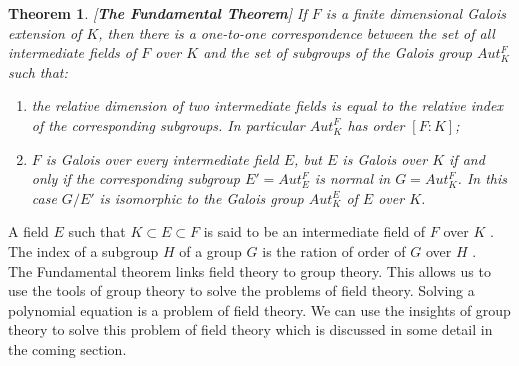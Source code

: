 \documentclass[a4paper,twoside,10pt]{article}
\theoremstyle{plain}
\newtheorem{theorem}{Theorem}[section]
\theoremstyle{definition}
\begin{document}
\begin{theorem} \cite{hunger} [\textbf{The Fundamental Theorem}]
  If \(F\) is a finite dimensional Galois extension of \(K\), then there is a one-to-one correspondence between the set of all intermediate fields of \(F\) over \(K\) and the set of subgroups of the Galois group \(Aut_K^F\) such that:
  \begin{enumerate}
  \item[i)] the relative dimension of two intermediate fields is equal to the relative index of the corresponding subgroups. In particular \(Aut_K^F\) has order \([F:K]\);
  \item[ii)] \(F\) is Galois over every intermediate field \(E\), but \(E\) is Galois over \(K\) if and only if the corresponding subgroup \(E'= Aut_E^F\) is normal in \(G=Aut_K^F\). In this case \(G/E'\) is isomorphic to the Galois group \(Aut_K^E\) of \(E\) over \(K\).
  \end{enumerate}
\end{theorem}
\vspace{2mm}
\noindent
A field \(E\) such that \(K \subset E \subset F\) is said to be an intermediate field of \(F\) over \(K\) \cite{hunger}. The index of a subgroup \(H\) of a group \(G\) is the ration of order of \(G\) over \(H\) \cite{hunger}.\\[3mm]

\noindent
The Fundamental theorem links field theory to group theory. This allows us to use the tools of group theory to solve the problems of field theory. Solving a polynomial equation is a problem of field theory. We can use the insights of group theory to solve this problem of field theory which is discussed in some detail in the coming section.
\clearpage
\end{document}
